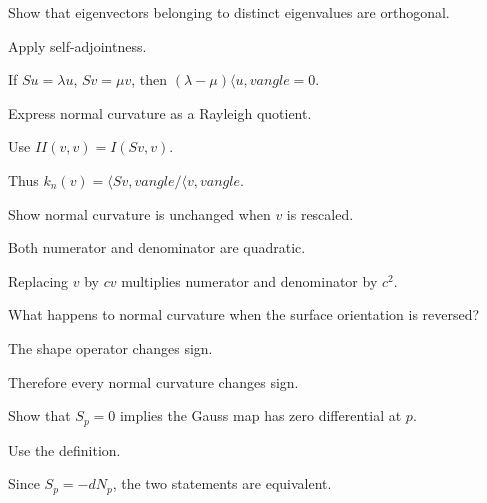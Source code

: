 \begin{exercise}\label{exr:vii16-13}
Show that eigenvectors belonging to distinct eigenvalues are orthogonal.
\end{exercise}
\begin{hint}
Apply self-adjointness.
\end{hint}
\begin{solution}
If \(Su=\lambda u\), \(Sv=\mu v\), then \((\lambda-\mu)\langle u,v
angle=0\).
\end{solution}

\begin{exercise}\label{exr:vii16-14}
Express normal curvature as a Rayleigh quotient.
\end{exercise}
\begin{hint}
Use \(II(v,v)=I(Sv,v)\).
\end{hint}
\begin{solution}
Thus \(k_n(v)=\langle Sv,v
angle/\langle v,v
angle\).
\end{solution}

\begin{exercise}\label{exr:vii16-15}
Show normal curvature is unchanged when \(v\) is rescaled.
\end{exercise}
\begin{hint}
Both numerator and denominator are quadratic.
\end{hint}
\begin{solution}
Replacing \(v\) by \(cv\) multiplies numerator and denominator by \(c^2\).
\end{solution}

\begin{exercise}\label{exr:vii16-16}
What happens to normal curvature when the surface orientation is reversed?
\end{exercise}
\begin{hint}
The shape operator changes sign.
\end{hint}
\begin{solution}
Therefore every normal curvature changes sign.
\end{solution}

\begin{exercise}\label{exr:vii16-17}
Show that \(S_p=0\) implies the Gauss map has zero differential at \(p\).
\end{exercise}
\begin{hint}
Use the definition.
\end{hint}
\begin{solution}
Since \(S_p=-dN_p\), the two statements are equivalent.
\end{solution}

